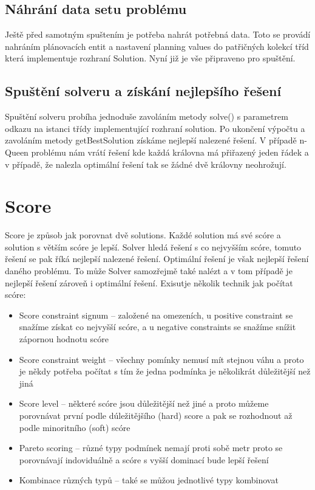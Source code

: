\subsection{Náhrání data setu problému}
Ještě před samotným spuštením je potřeba nahrát potřebná data. Toto se provádí nahráním plánovacích entit a nastavení planning values do patřičných kolekcí tříd která implementuje rozhraní Solution. Nyní již je vše připraveno pro spuštění.

\subsection{Spuštění solveru a získání nejlepšího řešení}
Spuštění solveru probíha jednoduše zavoláním metody solve() s parametrem odkazu na istanci třídy implementující rozhraní solution. Po ukončení výpočtu a zavoláním metody getBestSolution získáme nejlepší nalezené řešení. V případě n-Queen problému nám vrátí řešení kde každá královna má přiřazený jeden řádek a v případě, že nalezla optimální řešení tak se žádné dvě královny neohrožují.

\section{Score}
Score je způsob jak porovnat dvě solutions. Každé solution má své scóre a solution s větším scóre je lepší. Solver hledá řešení s co nejvyšším scóre, tomuto řešení se pak říká nejlepší nalezené řešení. Optimální řešení je však nejlepší řešení daného problému. To může Solver samozřejmě také nalézt a v tom případě je nejlepší řešení zároveň i optimální řešení. Exisutje několik technik jak počítat scóre:
\begin{itemize}
\item Score constraint signum -- založené na omezeních, u positive constraint se snažíme získat co nejvyšší scóre, a u negative constraints se snažíme snížit zápornou hodnotu scóre
\item Score constraint weight -- všechny pomínky nemusí mít stejnou váhu a proto je někdy potřeba počítat s tím že jedna podmínka je několikrát důležitější než jiná
\item Score level -- některé scóre jsou důležitější než jiné a proto můžeme porovnávat první podle dúležitějšího (hard) score a pak se rozhodnout až podle minoritního (soft) scóre
\item Pareto scoring -- různé typy podmínek nemají proti sobě metr proto se porovnávají indoviduálně a scóre s vyšší dominací bude lepší řešení
\item Kombinace různých typů -- také se můžou jednotlivé typy kombinovat
 
\end{itemize}

